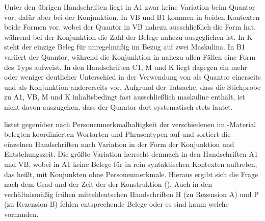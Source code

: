 Unter den übrigen Handschriften liegt in A1 zwar keine Variation beim Quantor
vor, dafür aber bei der Konjunktion. In VB und B1 kommen in beiden Kontexten
beide Formen vor, wobei der Quantor in VB nahezu ausschließlich die Form
 hat, während bei der Konjunktion die Zahl der Belege nahezu
ausgeglichen ist. In K steht der einzige Beleg für 
unregelmäßig im Bezug auf zwei Maskulina. In B1 variiert der
Quantor, während die Konjunktion in nahezu allen Fällen eine Form des Typs
 aufweist. In den Handschriften C1, M und K liegt dagegen ein mehr
oder weniger deutlicher Unterschied in der Verwendung von  als
Quantor einerseits und  als Konjunktion andererseits vor. Aufgrund
der Tatsache, dass die Stichprobe zu A1, VB, M und K inhaltsbedingt fast
ausschließlich maskuline  enthält, ist nicht davon auszugehen,
dass der Quantor dort systematisch stets
 lautet.

 listet  gegenüber  nach
Personenmerkmalhaltigkeit der verschiedenen im
\KC{}-Material belegten koordinierten Wortarten und Phrasentypen auf und
sortiert die einzelnen Handschriften nach Variation in der Form der Konjunktion
und Entstehungszeit. Die größte Varia\-tion herrscht demnach in den
Handschriften A1 und VB, wobei in A1 keine Belege für 
in rein syntaktischen Kontexten auftreten, das heißt, mit Konjunkten ohne
Personen\-merkmale. Hieraus ergibt sich die Frage nach dem Grad und der Zeit
der  der Konstruktion (). Auch
in den verhältnismäßig frühen mitteldeutschen Handschriften H
(zu Rezension A) und P (zu Rezension B) fehlen entsprechende Belege oder es
sind kaum welche vorhanden.

